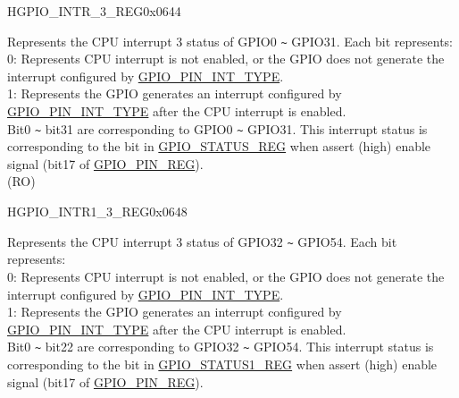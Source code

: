 \begin{register}{H}{GPIO\_INTR\_3\_REG}{0x0644}\label{regdesc:GPIOINTR3REG}
%
\regnewline%
\begin{regdesc}\begin{reglist}
\label{fielddesc:GPIOINT3}\item [GPIO\_INT\_3] Represents the CPU interrupt 3 status of GPIO0 \verb+~+ GPIO31. Each bit represents:\\
0: Represents CPU interrupt is not enabled, or the GPIO does not generate the interrupt configured by \hyperref[fielddesc:GPIOPINNINTTYPE]{GPIO\_PIN\_INT\_TYPE}.\\
1: Represents the GPIO generates an interrupt configured by \hyperref[fielddesc:GPIOPINNINTTYPE]{GPIO\_PIN\_INT\_TYPE} after the CPU interrupt is enabled.\\
Bit0 \verb+~+ bit31 are corresponding to GPIO0 \verb+~+ GPIO31. This interrupt status is corresponding to the bit in \hyperref[regdesc:GPIOSTATUSREG]{GPIO\_STATUS\_REG} when assert (high) enable signal (bit17 of \hyperref[regdesc:GPIOPINNREG]{GPIO\_PIN\_REG}). \\
(RO)
\end{reglist}\end{regdesc}
\end{register}


\begin{register}{H}{GPIO\_INTR1\_3\_REG}{0x0648}\label{regdesc:GPIOINTR13REG}
%
%
\regnewline%
\begin{regdesc}\begin{reglist}
\label{fielddesc:GPIOINT13}\item [GPIO\_INT1\_3] Represents the CPU interrupt 3 status of GPIO32 \verb+~+ GPIO54. Each bit represents:\\
0: Represents CPU interrupt is not enabled, or the GPIO does not generate the interrupt configured by \hyperref[fielddesc:GPIOPINNINTTYPE]{GPIO\_PIN\_INT\_TYPE}.\\
1: Represents the GPIO generates an interrupt configured by \hyperref[fielddesc:GPIOPINNINTTYPE]{GPIO\_PIN\_INT\_TYPE} after the CPU interrupt is enabled.\\
Bit0 \verb+~+ bit22 are corresponding to GPIO32 \verb+~+ GPIO54. This interrupt status is corresponding to the bit in \hyperref[regdesc:GPIOSTATUS1REG]{GPIO\_STATUS1\_REG} when assert (high) enable signal (bit17 of \hyperref[regdesc:GPIOPINNREG]{GPIO\_PIN\_REG}). \\
\end{reglist}\end{regdesc}
\end{register}


